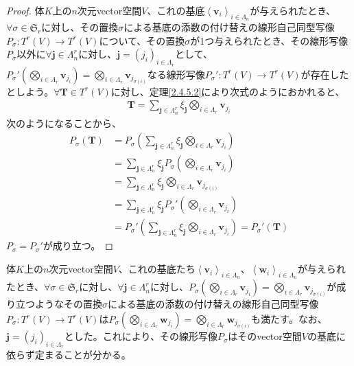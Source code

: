 \documentclass[dvipdfmx]{jsarticle}
\begin{document}
\begin{proof}
体$K$上の$n$次元vector空間$V$、これの基底$\left\langle \mathbf{v}_{i} \right\rangle_{i \in \varLambda_{n}}$が与えられたとき、$\forall\sigma \in \mathfrak{S}_{r}$に対し、その置換$\sigma$による基底の添数の付け替えの線形自己同型写像$P_{\sigma}:T^{r}(V) \rightarrow T^{r}(V)$について、その置換$\sigma$が1つ与えられたとき、その線形写像$P_{\sigma}$以外に$\forall\mathbf{j} \in \varLambda_{n}^{r}$に対し、$\mathbf{j}=\left( j_{i} \right)_{i \in \varLambda_{r}}$として、$P_{\sigma}'\left( \bigotimes_{i \in \varLambda_{r}} \mathbf{v}_{j_{i}} \right) = \bigotimes_{i \in \varLambda_{r}} \mathbf{v}_{j_{\sigma(i)}}$なる線形写像$P_{\sigma}':T^{r}(V) \rightarrow T^{r}(V)$が存在したとしよう。$\forall\mathbf{T} \in T^{r}(V)$に対し、定理\ref{2.4.5.2}により次式のようにおかれると、
\begin{align*}
\mathbf{T} = \sum_{\mathbf{j} \in \varLambda_{n}^{r}} {\xi_{\mathbf{j}}\bigotimes_{i \in \varLambda_{r}} \mathbf{v}_{j_{i}}}
\end{align*}
次のようになることから、
\begin{align*}
P_{\sigma}\left( \mathbf{T} \right) &= P_{\sigma}\left( \sum_{\mathbf{j} \in \varLambda_{n}^{r}} {\xi_{\mathbf{j}}\bigotimes_{i \in \varLambda_{r}} \mathbf{v}_{j_{i}}} \right)\\
&= \sum_{\mathbf{j} \in \varLambda_{n}^{r}} {\xi_{\mathbf{j}}P_{\sigma}\left( \bigotimes_{i \in \varLambda_{r}} \mathbf{v}_{j_{i}} \right)}\\
&= \sum_{\mathbf{j} \in \varLambda_{n}^{r}} {\xi_{\mathbf{j}}\bigotimes_{i \in \varLambda_{r}} \mathbf{v}_{j_{\sigma(i)}}}\\
&= \sum_{\mathbf{j} \in \varLambda_{n}^{r}} {\xi_{\mathbf{j}}P_{\sigma}'\left( \bigotimes_{i \in \varLambda_{r}} \mathbf{v}_{j_{i}} \right)}\\
&= P_{\sigma}'\left( \sum_{\mathbf{j} \in \varLambda_{n}^{r}} {\xi_{\mathbf{j}}\bigotimes_{i \in \varLambda_{r}} \mathbf{v}_{j_{i}}} \right) = P_{\sigma}'\left( \mathbf{T} \right)
\end{align*}
$P_{\sigma} = P_{\sigma}'$が成り立つ。
\end{proof}
\begin{thm}\label{2.4.8.4}
体$K$上の$n$次元vector空間$V$、これの基底たち$\left\langle \mathbf{v}_{i} \right\rangle_{i \in \varLambda_{n}}$、$\left\langle \mathbf{w}_{i} \right\rangle_{i \in \varLambda_{n}}$が与えられたとき、$\forall\sigma \in \mathfrak{S}_{r}$に対し、$\forall\mathbf{j} \in \varLambda_{n}^{r}$に対し、$P_{\sigma}\left( \bigotimes_{i \in \varLambda_{r}} \mathbf{v}_{j_{i}} \right) = \bigotimes_{i \in \varLambda_{r}} \mathbf{v}_{j_{\sigma(i)}}$が成り立つようなその置換$\sigma$による基底の添数の付け替えの線形自己同型写像$P_{\sigma}:T^{r}(V) \rightarrow T^{r}(V)$は$P_{\sigma}\left( \bigotimes_{i \in \varLambda_{r}} \mathbf{w}_{j_{i}} \right) = \bigotimes_{i \in \varLambda_{r}} \mathbf{w}_{j_{\sigma(i)}}$も満たす。なお、$\mathbf{j}=\left( j_{i} \right)_{i \in \varLambda_{r}}$とした。これにより、その線形写像$P_{\sigma}$はそのvector空間$V$の基底に依らず定まることが分かる。
\end{thm}
\end{document}
